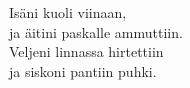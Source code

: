 
            Isäni kuoli viinaan, \\
            ja äitini paskalle ammuttiin. \\
            Veljeni linnassa hirtettiin \\
            ja siskoni pantiin puhki. \\
\hspace{10mm} \\
            \begin{comment} Lisäsäkeistö: \\
\hspace{10mm} \\
            Puhelinlangat kaulaan \\
            ja töpseli perseeseen. \\
            Kytkentä tuhanteen volttiin, \\
            sillä pääsee taivaaseen. \\
\end{comment}